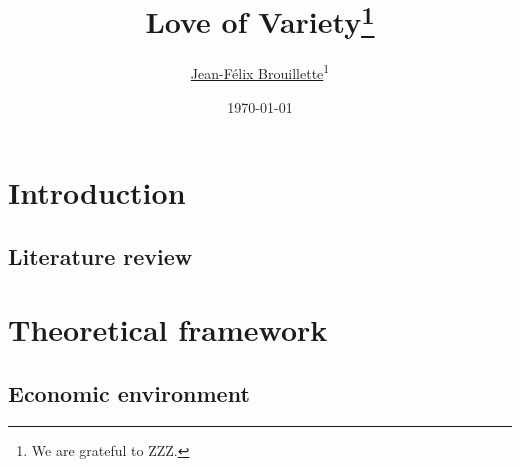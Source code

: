 \documentclass[12pt]{article}
\title{\textbf{Love of Variety}\thanks{We are grateful to ZZZ.}}
\author{\href{https://www.jeanfelixbrouillette.com}{Jean-F\'elix Brouillette}\textsuperscript{1}}
\date{\today}
\begin{document}
\maketitle


\begin{abstract}
    \lipsum[1]
\end{abstract}

\clearpage

\section{Introduction}
\label{s:introduction}

\subsection*{Literature review}
\label{s:literature review}

\section{Theoretical framework}
\label{s:theoretical framework}

\subsection{Economic environment}
\label{section:economic environment}
\end{document}
